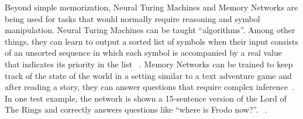 \documentclass[10pts]{article}
\newcommand{\citep}[1]{\cite{#1}}
\begin{document}



Beyond simple memorization, Neural Turing Machines and Memory Networks
are being used for tasks that would normally require reasoning and symbol manipulation.
Neural Turing Machines can be taught ``algorithms''. Among other
things, they can learn to output a sorted list of symbols when their
input consists of an unsorted sequence in which each symbol is
accompanied by a real value that indicates its priority in the list
~\citep{Graves-et-al-arxiv2014}.
Memory Networks can be trained to keep track of the state of the world
in a setting similar to a text adventure game and after reading a story,
they can answer questions that require complex 
inference~\cite{weston-babi-arxiv-2015}.
In one test
example, the network is shown a 15-sentence version of the Lord of The
Rings and correctly answers questions like ``where is Frodo now?''.
~\citep{weston-memorynet-2014}.

\end{document}
